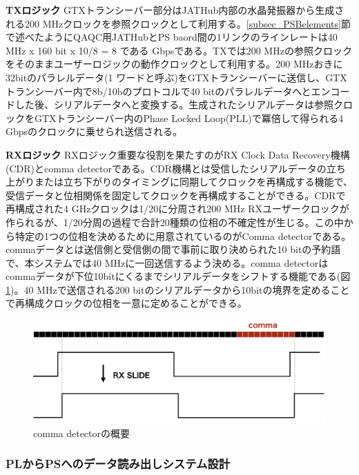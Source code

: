 \textbf{TXロジック}
\baselineskip
GTXトランシーバー部分はJATHub内部の水晶発振器から生成される200 MHzクロックを参照クロックとして利用する。\ref{subsec_PSBelements}節で述べたようにQAQC用JATHubとPS baord間の1リンクのラインレートは40 MHz x 160 bit x 10/8 = 8 である Gbpsである。TXでは200 MHzの参照クロックをそのままユーザーロジックの動作クロックとして利用する。200 MHzおきに32bitのパラレルデータ(1 ワードと呼ぶ)をGTXトランシーバーに送信し、GTXトランシーバー内で8b/10bのプロトコルで40 bitのパラレルデータへとエンコードした後、シリアルデータへと変換する。生成されたシリアルデータは参照クロックをGTXトランシーバー内のPhase Locked Loop(PLL)で冪倍して得られる4 Gbpsのクロックに乗せられ送信される。
\baselineskip

\textbf{RXロジック}
RXロジック重要な役割を果たすのがRX Clock Data Recovery機構(CDR)とcomma detectorである。CDR機構とは受信したシリアルデータの立ち上がりまたは立ち下がりのタイミングに同期してクロックを再構成する機能で、受信データと位相関係を固定してクロックを再構成することができる。CDRで再構成された4 GHzクロックは1/20に分周され200 MHz RXユーザークロックが作られるが、1/20分周の過程で合計20種類の位相の不確定性が生じる。この中から特定の1つの位相を決めるために用意されているのがComma detectorである。commaデータとは送信側と受信側の間で事前に取り決められた10 bitの予約語で、本システムでは40 MHzに一回送信するよう決める。comma detectorはcommaデータが下位10bitにくるまでシリアルデータをシフトする機能である(図\ref{JATHubcomma})。40 MHzで送信される200 bitのシリアルデータから10bitの境界を定めることで再構成クロックの位相を一意に定めることができる。

\begin{figure} 
\centering
\includegraphics[width=16cm]{fig/JATHubcomma.png}
\caption[comma detectorの概要]{comma detectorの概要}
\label{JATHubcomma}
\end{figure}
\baselineskip


\subsubsection{PLからPSへのデータ読み出しシステム設計}
\label{subsubsec_readout}


